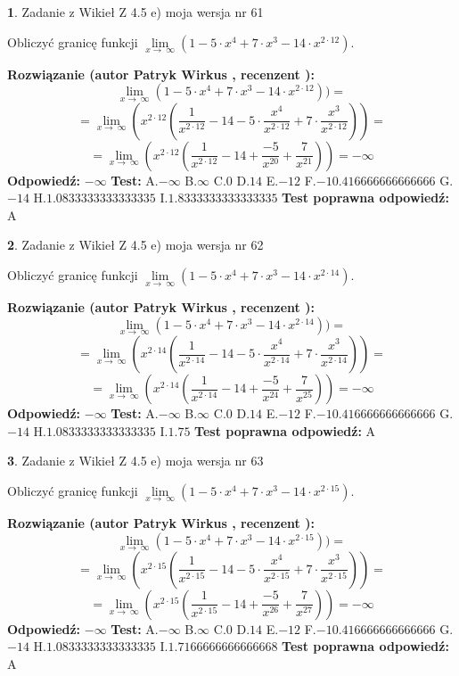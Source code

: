 \documentclass[12pt, a4paper]{article}
\theoremstyle{definition} %
\newtheorem{zad}{}
\newcommand{\zadStart}[1]{\begin{zad}#1\newline}
\newcommand{\zadStop}{\end{zad}}
\newcommand{\rozwStart}[2]{\noindent \textbf{Rozwiązanie (autor #1 , recenzent #2): }\newline}
\newcommand{\rozwStop}{\newline}
\newcommand{\odpStart}{\noindent \textbf{Odpowiedź:}\newline}
\newcommand{\odpStop}{\newline}
\newcommand{\testStart}{\noindent \textbf{Test:}\newline}
\newcommand{\testStop}{\newline}
\newcommand{\kluczStart}{\noindent \textbf{Test poprawna odpowiedź:}\newline}
\newcommand{\kluczStop}{\newline}
\begin{document}
\zadStart{Zadanie z Wikieł Z 4.5 e) moja wersja nr 61}


Obliczyć granicę funkcji  $\lim\limits_{x\to\ \infty}(1 - 5 \cdot x^{4}+7 \cdot x^{3}- 14 \cdot x^{2\cdot12})$.
\zadStop
\rozwStart{Patryk Wirkus}{}
$$\lim\limits_{x\to\ \infty}(1 - 5 \cdot x^{4}+7 \cdot x^{3}- 14 \cdot x^{2\cdot12}))=$$
$$=\lim\limits_{x\to\ \infty}(x^{2\cdot12}(\frac{1}{x^{2\cdot12}}-14 -5 \cdot \frac{x^{4}}{x^{2\cdot12}}+7 \cdot \frac{x^{3}}{x^{2\cdot12}}))=$$
$$=\lim\limits_{x\to\ \infty}(x^{2\cdot12}(\frac{1}{x^{2\cdot12}}-14 + \frac{-5}{x^{20}}+ \frac{7}{x^{21}}))=-\infty$$
\rozwStop
\odpStart
$-\infty$
\odpStop
\testStart
A.$-\infty$ B.$\infty$ C.$0$ D.$14$ E.$-12$
F.$-10.416666666666666$ G.$-14$
H.$1.0833333333333335$
I.$1.8333333333333335$
\testStop
\kluczStart
A
\kluczStop



\zadStart{Zadanie z Wikieł Z 4.5 e) moja wersja nr 62}


Obliczyć granicę funkcji  $\lim\limits_{x\to\ \infty}(1 - 5 \cdot x^{4}+7 \cdot x^{3}- 14 \cdot x^{2\cdot14})$.
\zadStop
\rozwStart{Patryk Wirkus}{}
$$\lim\limits_{x\to\ \infty}(1 - 5 \cdot x^{4}+7 \cdot x^{3}- 14 \cdot x^{2\cdot14}))=$$
$$=\lim\limits_{x\to\ \infty}(x^{2\cdot14}(\frac{1}{x^{2\cdot14}}-14 -5 \cdot \frac{x^{4}}{x^{2\cdot14}}+7 \cdot \frac{x^{3}}{x^{2\cdot14}}))=$$
$$=\lim\limits_{x\to\ \infty}(x^{2\cdot14}(\frac{1}{x^{2\cdot14}}-14 + \frac{-5}{x^{24}}+ \frac{7}{x^{25}}))=-\infty$$
\rozwStop
\odpStart
$-\infty$
\odpStop
\testStart
A.$-\infty$ B.$\infty$ C.$0$ D.$14$ E.$-12$
F.$-10.416666666666666$ G.$-14$
H.$1.0833333333333335$
I.$1.75$
\testStop
\kluczStart
A
\kluczStop



\zadStart{Zadanie z Wikieł Z 4.5 e) moja wersja nr 63}


Obliczyć granicę funkcji  $\lim\limits_{x\to\ \infty}(1 - 5 \cdot x^{4}+7 \cdot x^{3}- 14 \cdot x^{2\cdot15})$.
\zadStop
\rozwStart{Patryk Wirkus}{}
$$\lim\limits_{x\to\ \infty}(1 - 5 \cdot x^{4}+7 \cdot x^{3}- 14 \cdot x^{2\cdot15}))=$$
$$=\lim\limits_{x\to\ \infty}(x^{2\cdot15}(\frac{1}{x^{2\cdot15}}-14 -5 \cdot \frac{x^{4}}{x^{2\cdot15}}+7 \cdot \frac{x^{3}}{x^{2\cdot15}}))=$$
$$=\lim\limits_{x\to\ \infty}(x^{2\cdot15}(\frac{1}{x^{2\cdot15}}-14 + \frac{-5}{x^{26}}+ \frac{7}{x^{27}}))=-\infty$$
\rozwStop
\odpStart
$-\infty$
\odpStop
\testStart
A.$-\infty$ B.$\infty$ C.$0$ D.$14$ E.$-12$
F.$-10.416666666666666$ G.$-14$
H.$1.0833333333333335$
I.$1.7166666666666668$
\testStop
\kluczStart
A
\kluczStop
\end{document}
